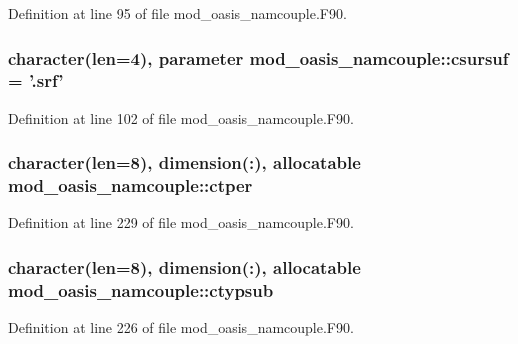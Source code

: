 Definition at line 95 of file mod\+\_\+oasis\+\_\+namcouple.\+F90.

\hypertarget{classmod__oasis__namcouple_adf2c151a84c37bd7cd93867305b4f70b}{
\subsubsection[{csursuf}]{\setlength{\rightskip}{0pt plus 5cm}character(len=4), parameter mod\+\_\+oasis\+\_\+namcouple\+::csursuf = '.srf'\hspace{0.3cm}{\ttfamily [private]}}}\label{classmod__oasis__namcouple_adf2c151a84c37bd7cd93867305b4f70b}


Definition at line 102 of file mod\+\_\+oasis\+\_\+namcouple.\+F90.

\hypertarget{classmod__oasis__namcouple_aa179b0a473551b48ef895497515d021c}{
\subsubsection[{ctper}]{\setlength{\rightskip}{0pt plus 5cm}character(len=8), dimension(\+:), allocatable mod\+\_\+oasis\+\_\+namcouple\+::ctper\hspace{0.3cm}{\ttfamily [private]}}}\label{classmod__oasis__namcouple_aa179b0a473551b48ef895497515d021c}


Definition at line 229 of file mod\+\_\+oasis\+\_\+namcouple.\+F90.

\hypertarget{classmod__oasis__namcouple_ad8f8aca3a6fa885e4edf027b79a93305}{
\subsubsection[{ctypsub}]{\setlength{\rightskip}{0pt plus 5cm}character(len=8), dimension(\+:), allocatable mod\+\_\+oasis\+\_\+namcouple\+::ctypsub\hspace{0.3cm}{\ttfamily [private]}}}\label{classmod__oasis__namcouple_ad8f8aca3a6fa885e4edf027b79a93305}


Definition at line 226 of file mod\+\_\+oasis\+\_\+namcouple.\+F90.

